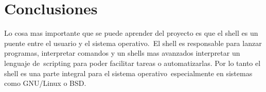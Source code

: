\section{Conclusiones}
Lo cosa mas importante que se puede aprender del proyecto es que el shell es un puente entre el usuario y el sistema operativo.\
El shell es responsable para lanzar programas, interpretar comandos y un shells mas avanzados interpretar un lenguaje de\
scripting para poder facilitar tareas o automatizarlas. Por lo tanto el shell es una parte integral para el sistema operativo\
especialmente en sistemas como GNU/Linux o BSD.